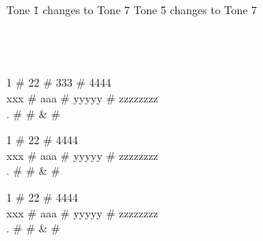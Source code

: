 \begin{tabbing}
	Tone \= 1 changes to Tone \= 7 \qquad Tone \= 5 changes to Tone \= 7 \\
	                                                     \\
	                                                     \\
	                                                             \\
\end{tabbing}

\begin{cmh}
	1   # 22  # 333   # 4444     \\
	xxx # aaa # yyyyy # zzzzzzzz \\
	.   #     # &     #          \\
\end{cmh}

\begin{mixed}
	1    # 22       # 4444     \\
	xxx  # aaa  #  yyyyy  # zzzzzzzz \\
	.    #      #  &      #          \\
\end{mixed}

\begin{another}
	1   #      22     #      4444     \\
	xxx #      aaa  #      yyyyy #      zzzzzzzz \\
	.   #           #      &     #               \\
\end{another}
